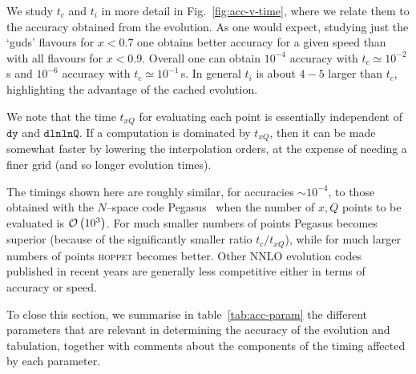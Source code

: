 \documentclass[12pt]{article}
\newcommand{\dy}{\ttt{dy}}
\newcommand{\dlnlnQ}{\ttt{dlnlnQ}}
\newcommand{\hoppet}{\textsc{hoppet}\xspace}
\newcommand{\ttt}[1]{\texttt{#1}}
\newcommand{\order}[1]{{\cal O}\left(#1\right)}
\begin{document}
We study $t_c$ and $t_i$ in more detail in Fig.~\ref{fig:acc-v-time},
where we relate them to the accuracy obtained from the evolution. As
one would expect, studying just the `guds' flavours for $x<0.7$ one
obtains better accuracy for a given speed than with all flavours for
$x<0.9$. Overall one can obtain $10^{-4}$ accuracy with $t_c \simeq
10^{-2}$\,s and $10^{-6}$ accuracy with $t_c \simeq 10^{-1}$\,s. In
general $t_i$ is about $4-5$ larger than $t_c$, highlighting the
advantage of the cached evolution. 

We note that the time $t_{xQ}$ for evaluating each point is
essentially independent of $\dy$ and $\dlnlnQ$. If a computation is
dominated by $t_{xQ}$, then it can be made somewhat faster by
lowering the interpolation orders, at the expense of needing a finer
grid (and so longer evolution times).

The timings shown here are roughly similar, for accuracies $\sim
10^{-4}$, to those obtained with the $N$--space code
Pegasus~\cite{Pegasus} when the number of $x,Q$ points to be
evaluated is $\order{10^3}$. For much smaller numbers of points
Pegasus becomes superior (because of the significantly smaller ratio
$t_c/t_{xQ}$), while for much larger numbers of points \hoppet becomes
better. Other NNLO evolution codes published in recent years 
\cite{Weinzierl:2002mv,Cafarella:2003jr,Cafarella:2005zj,Cafarella:2008du,Botje}
 are generally less competitive
either in terms of accuracy or speed.

To close this section, we summarise in table~\ref{tab:acc-param} the
different parameters that are relevant in determining the accuracy of
the evolution and tabulation, together with comments about the
components of the timing affected by each parameter.
\end{document}
